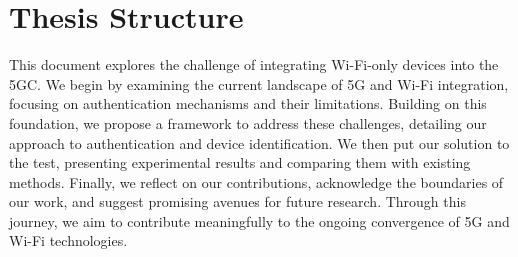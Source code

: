 \section{Thesis Structure}

This document explores the challenge of integrating Wi-Fi-only devices into the \ac{5GC}. We begin by examining the current landscape of \ac{5G} and Wi-Fi integration, focusing on authentication mechanisms and their limitations. Building on this foundation, we propose a framework to address these challenges, detailing our approach to authentication and device identification. We then put our solution to the test, presenting experimental results and comparing them with existing methods. Finally, we reflect on our contributions, acknowledge the boundaries of our work, and suggest promising avenues for future research. Through this journey, we aim to contribute meaningfully to the ongoing convergence of \ac{5G} and Wi-Fi technologies.